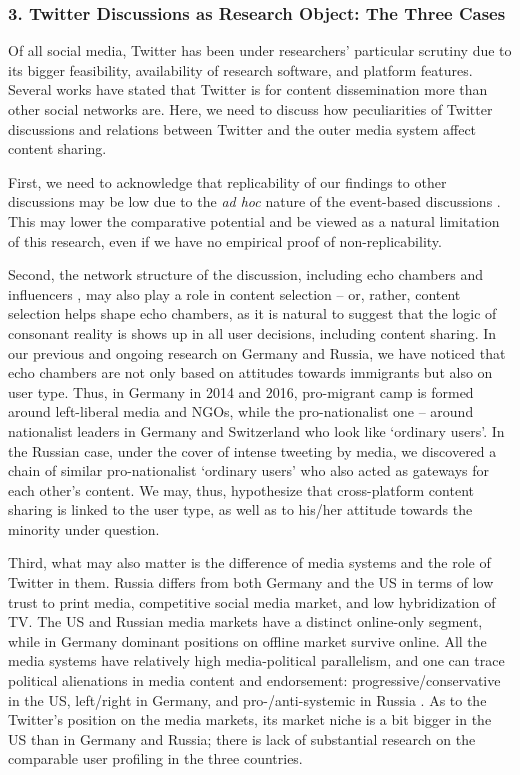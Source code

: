 \subsubsection{3. Twitter Discussions as Research Object: The Three Cases}

Of all social media, Twitter has been under researchers’ particular scrutiny due to its bigger feasibility, availability of research software, and platform features. Several works \cite{BakshyRosennMarlow,ShiRuiWhinston} have stated that Twitter is for content dissemination more than other social networks are. Here, we need to discuss how peculiarities of Twitter discussions \cite{ChaBenevenutoHaddadi} and relations between Twitter and the outer media system affect content sharing.

First, we need to acknowledge that replicability of our findings to other discussions may be low due to the \textit{ad hoc} nature of the event-based discussions \cite{BrunsBurgess}. This may lower the comparative potential and be viewed as a natural limitation of this research, even if we have no empirical proof of non-replicability.

Second, the network structure of the discussion, including echo chambers and influencers \cite{BodrunovaBlekanovMaksimov}, may also play a role in content selection -- or, rather, content selection helps shape echo chambers, as it is natural to suggest that the logic of consonant reality \cite{NoelleNeumann} is shows up in all user decisions, including content sharing. In our previous \cite{BodrunovaLitvinenkoGavraYakunin,BodrunovaLitvinenkoBlekanov2016} and ongoing research on Germany and Russia, we have noticed that echo chambers are not only based on attitudes towards immigrants but also on user type. Thus, in Germany in 2014 and 2016, pro-migrant camp is formed around left-liberal media and NGOs, while the pro-nationalist one -- around nationalist leaders in Germany and Switzerland who look like ‘ordinary users’. In the Russian case, under the cover of intense tweeting by media, we discovered a chain of similar pro-nationalist ‘ordinary users’ who also acted as gateways for each other’s content. We may, thus, hypothesize that cross-platform content sharing is linked to the user type, as well as to his/her attitude towards the minority under question.

Third, what may also matter is the difference of media systems and the role of Twitter in them. Russia differs from both Germany and the US in terms of low trust to print media, competitive social media market, and low hybridization of TV. The US and Russian media markets have a distinct online-only segment, while in Germany dominant positions on offline market survive online. All the media systems have relatively high media-political parallelism, and one can trace political alienations in media content and endorsement: progressive/conservative in the US, left/right in Germany, and pro-/anti-systemic in Russia \cite{BodrunovaLitvinenko2013,BodrunovaLitvinenkoGavraYakunin}. As to the Twitter’s position on the media markets, its market niche is a bit bigger in the US than in Germany and Russia; there is lack of substantial research on the comparable user profiling in the three countries.

